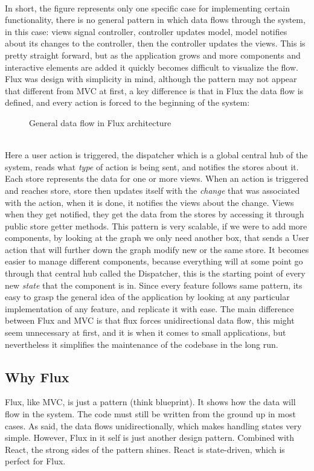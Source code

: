 \\In short, the figure represents only one specific case for implementing certain functionality, there is no general pattern in which data flows through the system, in this case: views signal controller, controller updates model, model notifies about its changes to the controller, then the controller updates the views. This is pretty straight forward, but as the application grows and more components and interactive elements are added it quickly becomes difficult to visualize the flow.
\\Flux was design with simplicity in mind, although the pattern may not appear that different from MVC at first, a key difference is that in Flux the data flow is defined, and every action is forced to the beginning of the system:
\begin{figure}[h]
\centering
\scalebox{0.8}{{}}
\caption{General data flow in Flux architecture}
\end{figure}
\\Here a user action is triggered, the dispatcher which is a global central hub of the system, reads what \emph{type} of action is being sent, and notifies the stores about it. Each store represents the data for one or more views. When an action is triggered and reaches store, store then updates itself with the \emph{change} that was associated with the action, when it is done, it notifies the views about the change. Views when they get notified, they get the data from the stores by accessing it through public store getter methods.
This pattern is very scalable, if we were to add more components, by looking at the graph we only need another box, that sends a User action that will further down the graph modify new or the same store. It becomes easier to manage different components, because everything will at some point go through that central hub called the Dispatcher, this is the starting point of every new \emph{state} that the component is in. Since every feature follows same pattern, its easy to grasp the general idea of the application by looking at any particular implementation of any feature, and replicate it with ease. The main difference between Flux and MVC is that flux forces unidirectional data flow, this might seem unnecessary at first, and it is when it comes to small applications, but nevertheless it simplifies the maintenance of the codebase in the long run.

\subsection{Why Flux}
Flux, like MVC, is just a pattern (think blueprint). It shows how the data will flow in the system. The code must still be written from the ground up in most cases. As said, the data flows unidirectionally, which makes handling states very simple. However, Flux in it self is just another design pattern. Combined with React, the strong sides of the pattern shines. React is state-driven, which is perfect for Flux.

